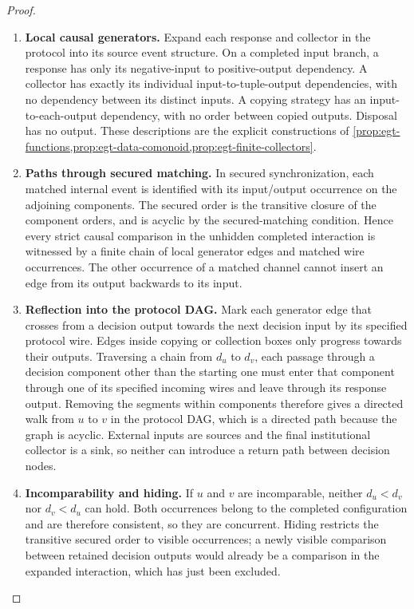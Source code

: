 \documentclass[11pt,a4paper]{article}
\numberwithin{equation}{section}
\theoremstyle{definition}
\theoremstyle{remark}
\theoremstyle{plain}
\begin{document}
\begin{proof}
\leavevmode
\begin{enumerate}[label=\textup{(\arabic*)},leftmargin=*,itemsep=4pt,topsep=3pt]
  \item \textbf{Local causal generators.} Expand each response and
collector in the protocol into its source event structure. On a
completed input branch, a response has only its negative-input to
positive-output dependency. A collector has exactly its individual
input-to-tuple-output dependencies, with no dependency between its
distinct inputs. A copying strategy has an input-to-each-output
dependency, with no order between copied outputs. Disposal has no
output. These descriptions are the explicit constructions of
\cref{prop:egt-functions,prop:egt-data-comonoid,prop:egt-finite-collectors}.
  \item \textbf{Paths through secured matching.} In secured
synchronization, each matched internal event is identified with its
input/output occurrence on the adjoining components. The secured
order is the transitive closure of the component orders, and is
acyclic by the secured-matching condition. Hence every strict causal
comparison in the unhidden completed interaction is witnessed by a
finite chain of local generator edges and matched wire occurrences.
The other occurrence of a matched channel cannot insert an edge from
its output backwards to its input.
  \item \textbf{Reflection into the protocol DAG.} Mark each generator
edge that crosses from a decision output towards the next decision
input by its specified protocol wire. Edges inside copying or
collection boxes only progress towards their outputs. Traversing a
chain from $d_u$ to $d_v$, each passage through a decision component
other than the starting one must enter that component through one of
its specified incoming wires and leave through its response output.
Removing the segments within components therefore gives a directed
walk from $u$ to $v$ in the protocol DAG, which is a directed path
because the graph is acyclic. External inputs are sources and the
final institutional collector is a sink, so neither can introduce a
return path between decision nodes.
  \item \textbf{Incomparability and hiding.} If $u$ and $v$ are
incomparable, neither $d_u<d_v$ nor $d_v<d_u$ can hold. Both
occurrences belong to the completed configuration and are therefore
consistent, so they are concurrent. Hiding restricts the transitive
secured order to visible occurrences; a newly visible comparison
between retained decision outputs would already be a comparison in
the expanded interaction, which has just been excluded.
\end{enumerate}
\end{proof}
\end{document}
